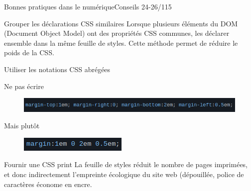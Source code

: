 \begin{frame}{Bonnes pratiques dans le numérique}{Conseils 24-26/115}
\begin{block}{Grouper les déclarations CSS similaires}
Lorsque plusieurs éléments du DOM (Document Object Model) ont des propriétés CSS communes, les déclarer ensemble dans la même feuille de styles. Cette méthode permet de réduire le poids de la CSS.
\end{block}

\begin{block}{Utiliser les notations CSS abrégées}
\begin{minipage}[b]{0.7\linewidth}
\begin{alertblock}{Ne pas écrire}
\begin{figure}
    \includegraphics[scale=0.35]{chapitre2/wdd3/fig/c5.png}
    \centering
\end{figure}
 \end{alertblock}
\end{minipage}\hfill
\begin{minipage}[b]{0.3\linewidth}
\begin{exampleblock}{Mais plutôt}
\begin{figure}
    \includegraphics[scale=0.49]{chapitre2/wdd3/fig/c6.png}
    \centering
\end{figure}
 \end{exampleblock}
\end{minipage}\hfill

\end{block}


\begin{block}{Fournir une CSS print}
La feuille de styles réduit le nombre de pages imprimées, et donc indirectement l’empreinte écologique du site web (dépouillée, police de caractères économe en encre.

\end{block}

\end{frame}


